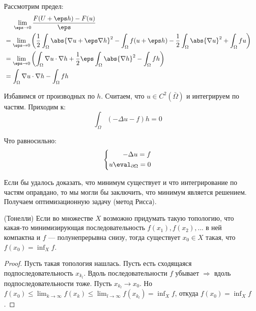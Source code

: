 Рассмотрим предел:
\begin{equation}
  \begin{aligned}
    &\phantom{{}={}} \lim_{\eps \to 0} \frac{F(U + \eps h) - F(u)}{\eps} \\
    &= \lim_{\eps \to 0} \left(\frac{1}{2} \int_\Omega \abs{\nabla u + \eps \nabla h}^2 - \int_\Omega f (u + \eps h) - \frac{1}{2} \int_\Omega \abs{\nabla u}^2 + \int_\Omega fu \right) \\
    &= \lim_{\eps \to 0} \left(\int_\Omega \nabla u \cdot \nabla h + \frac{1}{2} \eps \int_\Omega \abs{\nabla h}^2 - \int_\Omega fh \right) \\
    &= \int_\Omega \nabla u \cdot \nabla h - \int_\Omega fh
  \end{aligned}
\end{equation}

Избавимся от производных по $h$. Считаем, что $u \in C^2(\bar{\Omega})$ и интегрируем по частям. Приходим к:
\begin{equation}
  \int_\Omega (-\Delta u - f) h = 0
\end{equation}

Что равносильно:
\begin{equation}
  \left\{\begin{aligned}
    -\Delta u = f \\
    u \eval_{\partial \Omega} = 0
  \end{aligned}\right.
\end{equation}

Если бы удалось доказать, что минимум существует и что интегрирование по частям оправдано, то мы могли бы заключить, что минимум является решением. Получаем оптимизационную задачу (метод Рисса).
\bigskip


\begin{thm}(Тонелли)
  Если во множестве $X$ возможно придумать такую топологию, что какая-то минимизирующая последовательность $f(x_1), f(x_2), \ldots$ в ней компактна и $f$ --- полунепрерывна снизу, тогда существует $x_0 \in X$ такая, что $f(x_0) = \inf_X f$.
\end{thm}

\begin{proof}
  Пусть такая топология нашлась. Пусть есть сходящаяся подпоследовательность $x_{k_l}$. Вдоль последовательности $f$ убывает $\Rightarrow$ вдоль подпоследовательности тоже. Пусть $x_{k_l} \to x_0$. Но $f(x_0) \le \lim_{k \to \infty} f(x_k) \le \lim_{l \to \infty} f(x_{k_l}) = \inf_X f$, откуда $f(x_0) = \inf_X f$.
\end{proof}

